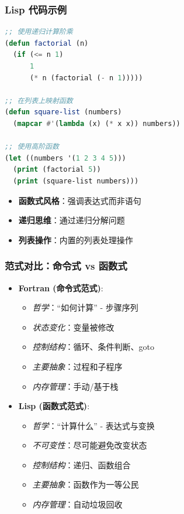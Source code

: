 \documentclass{beamer}
\begin{document}
\begin{frame}[fragile,t]
\frametitle{Lisp 代码示例}
\scriptsize
\begin{lstlisting}[language=Lisp, caption=Common Lisp Style]
;; 使用递归计算阶乘
(defun factorial (n)
  (if (<= n 1)
      1
      (* n (factorial (- n 1)))))

;; 在列表上映射函数
(defun square-list (numbers)
  (mapcar #'(lambda (x) (* x x)) numbers))

;; 使用高阶函数
(let ((numbers '(1 2 3 4 5)))
  (print (factorial 5))
  (print (square-list numbers)))
\end{lstlisting}

\begin{itemize}
    \item \textbf{函数式风格}：强调表达式而非语句
    \item \textbf{递归思维}：通过递归分解问题
    \item \textbf{列表操作}：内置的列表处理操作
\end{itemize}
\end{frame}

\begin{frame}[t]
\frametitle{范式对比：命令式 vs 函数式}
\begin{itemize}
    \item \textbf{Fortran (命令式范式)}:
    \begin{itemize}
        \item \textit{哲学}：“如何计算” - 步骤序列
        \item \textit{状态变化}：变量被修改
        \item \textit{控制结构}：循环、条件判断、goto
        \item \textit{主要抽象}：过程和子程序
        \item \textit{内存管理}：手动/基于栈
    \end{itemize}
    
    \item \textbf{Lisp (函数式范式)}:
    \begin{itemize}
        \item \textit{哲学}：“计算什么” - 表达式与变换
        \item \textit{不可变性}：尽可能避免改变状态
        \item \textit{控制结构}：递归、函数组合
        \item \textit{主要抽象}：函数作为一等公民
        \item \textit{内存管理}：自动垃圾回收
    \end{itemize}
\end{itemize}
\end{frame}
\end{document}

